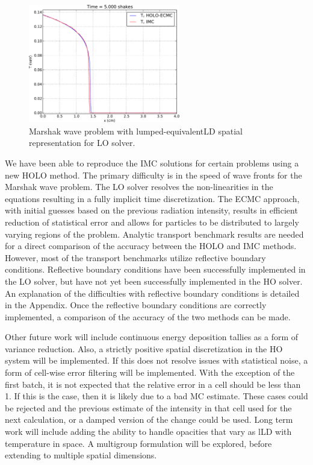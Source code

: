 \documentclass{mc2013}
\begin{document}
    \begin{figure}
        \centering
    \includegraphics[width=0.59\textwidth]{marshak_holo_lumped.pdf}
        \caption{\label{lumped_marshak} Marshak wave problem with lumped-equivalentLD spatial representation for  LO
        solver.}
    \end{figure}


We have been able to reproduce the IMC solutions for certain problems using a new HOLO method.  The primary difficulty is in the speed of wave fronts for the Marshak wave problem.  The LO solver resolves the non-linearities in the equations resulting in a fully implicit time discretization.  The ECMC approach, with initial guesses based on the previous radiation intensity, results in efficient reduction of statistical error and allows for particles to be distributed to largely varying regions of the problem.  Analytic transport benchmark results are
needed for a direct comparison of the accuracy between the HOLO and IMC methods.  However, most of
the transport benchmarks utilize reflective boundary conditions.
Reflective boundary conditions have been successfully implemented in the LO solver,
but have not yet been successfully implemented in the HO solver.  An explanation of the
difficulties with reflective boundary conditions is detailed in the Appendix.  Once
the reflective boundary conditions are correctly implemented, a comparison of the
accuracy of the two methods can be made.

Other future work will include continuous energy deposition tallies as a form of variance reduction.  Also, a strictly positive spatial discretization in the HO system will be implemented.  If this does not resolve issues with statistical noise, a form of cell-wise error filtering will be implemented.  With the exception of the first batch, it is not expected that the relative error in a cell should be less than 1.  If this is the case, then it is likely due to a bad MC estimate.  These cases could be rejected and the previous estimate of the intensity in that cell used for the next calculation, or a damped version of the change could be used.    Long term work will include adding the ability to handle opacities that vary as lLD with temperature in space.  A multigroup formulation will be explored, before extending to multiple spatial dimensions.
\end{document}
